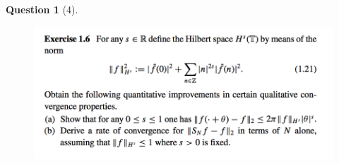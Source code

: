 \documentclass{article} %
\theoremstyle{quest}
\newtheorem*{question}{Question}
\begin{document}
\begin{question}[4]
\hfill
\begin{figure}[h!]
  \centering
    \includegraphics[width=1\textwidth]{HA-1-4.png}
\end{figure}
\end{question}
\end{document}
